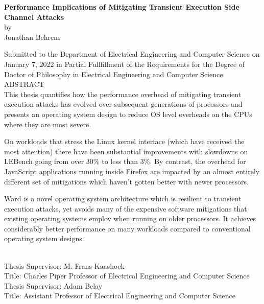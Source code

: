 
\singlespace
\begin{center}

{\large \bf Performance Implications of Mitigating Transient Execution Side Channel Attacks} \\[.5\baselineskip]
by \\
Jonathan Behrens \\[.5\baselineskip]
\end{center}

Submitted to the Department of Electrical Engineering and Computer Science on January 7, 2022 in Partial Fullfillment of the Requirements for the Degree of Doctor of Philosophy in Electrical Engineering and Computer Science.\\[.5\baselineskip]

\noindent
ABSTRACT \\

This thesis quantifies how the performance overhead of mitigating transient execution attacks has evolved over subsequent generations of processors and presents an operating system design to reduce OS level overheads on the CPUs where they are most severe.  

On workloads that stress the Linux kernel interface (which have received the most attention) there have been substantial improvements with slowdowns on LEBench going from over 30\% to less than 3\%.
By contrast, the overhead for JavaScript applications running inside Firefox are impacted by an almost entirely different set of mitigations which haven't gotten better with newer processors.

Ward is a novel operating system architecture which is resilient to transient execution attacks, yet avoids many of the expensive software mitigations that existing operating systems employ when running on older processors. 
It achieves considerably better performance on many workloads compared to conventional operating system designs.

~\\[\baselineskip]

\noindent
Thesis  Supervisor:  M.  Frans  Kaashoek \\
Title:  Charles  Piper  Professor  of Electrical  Engineering  and  Computer  Science \\[.5\baselineskip]
\noindent
Thesis  Supervisor:  Adam Belay \\
Title:  Assistant Professor  of Electrical  Engineering  and  Computer  Science \\

\doublespace